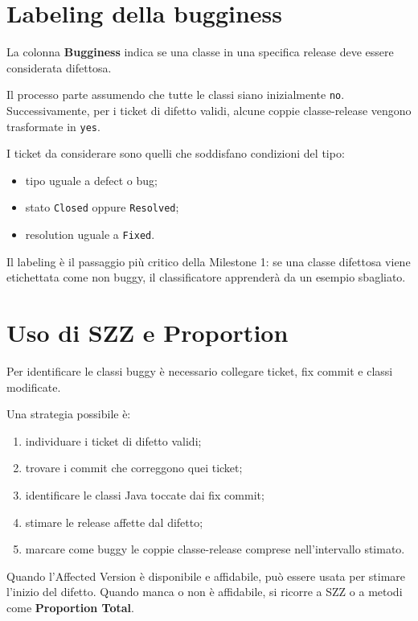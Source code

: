 \section{Labeling della bugginess}

La colonna \textbf{Bugginess} indica se una classe in una specifica release deve essere considerata difettosa.

Il processo parte assumendo che tutte le classi siano inizialmente \texttt{no}. Successivamente, per i ticket di difetto validi, alcune coppie classe-release vengono trasformate in \texttt{yes}.

I ticket da considerare sono quelli che soddisfano condizioni del tipo:

\begin{itemize}
    \item tipo uguale a defect o bug;
    \item stato \texttt{Closed} oppure \texttt{Resolved};
    \item resolution uguale a \texttt{Fixed}.
\end{itemize}

\begin{notaesame}
Il labeling è il passaggio più critico della Milestone 1: se una classe difettosa viene etichettata come non buggy, il classificatore apprenderà da un esempio sbagliato.
\end{notaesame}

\section{Uso di SZZ e Proportion}

Per identificare le classi buggy è necessario collegare ticket, fix commit e classi modificate.

Una strategia possibile è:

\begin{enumerate}
    \item individuare i ticket di difetto validi;
    \item trovare i commit che correggono quei ticket;
    \item identificare le classi Java toccate dai fix commit;
    \item stimare le release affette dal difetto;
    \item marcare come buggy le coppie classe-release comprese nell'intervallo stimato.
\end{enumerate}

Quando l'Affected Version è disponibile e affidabile, può essere usata per stimare l'inizio del difetto. Quando manca o non è affidabile, si ricorre a SZZ o a metodi come \textbf{Proportion Total}.

